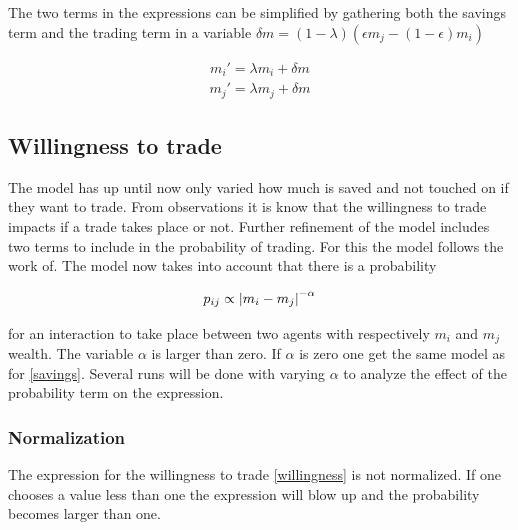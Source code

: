  The two terms in the expressions can be simplified by gathering both the savings term and the trading term in a variable $\delta m=(1-\lambda)(\epsilon m_j-(1-\epsilon)m_i)$
 
 \begin{align*}
	 m_i'=\lambda m_i+\delta m
 \end{align*}
 \begin{align*}
	 m_j'=\lambda m_j+\delta m
 \end{align*}

\subsection{Willingness to trade}

The model has up until now only varied how much is saved and not touched on if they want to trade. From observations it is know that the willingness to trade impacts if a trade takes place or not. Further refinement of the model includes two terms to include in the probability of trading. For this the model follows the work of.\cite{goswami} The model now takes into account that there is a probability

\begin{align}
	p_{ij}\propto \abs{m_i-m_j}^{-\alpha}\label{eq:willingness}
\end{align}

for an interaction to take place between two agents with respectively $m_i$ and $m_j$ wealth. The variable $\alpha$ is larger than zero. If $\alpha$ is zero one get the same model as for \ref{savings}. Several runs will be done with varying $\alpha$ to analyze the effect of the probability term on the expression.

\subsubsection{Normalization}
\label{sec:normalization1}
The expression for the willingness to trade \ref{willingness} is not normalized. If one chooses a value less than one the expression will blow up and the probability becomes larger than one.\\

